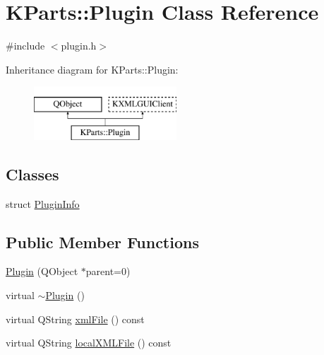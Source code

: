 \hypertarget{classKParts_1_1Plugin}{\section{K\+Parts\+:\+:Plugin Class Reference}
\label{classKParts_1_1Plugin}
}


{\ttfamily \#include $<$plugin.\+h$>$}

Inheritance diagram for K\+Parts\+:\+:Plugin\+:\begin{figure}[H]
\begin{center}
\leavevmode
\includegraphics[height=2.000000cm]{classKParts_1_1Plugin}
\end{center}
\end{figure}
\subsection*{Classes}
\begin{DoxyCompactItemize}
\item 
struct \hyperlink{structKParts_1_1Plugin_1_1PluginInfo}{Plugin\+Info}
\end{DoxyCompactItemize}
\subsection*{Public Member Functions}
\begin{DoxyCompactItemize}
\item 
\hyperlink{classKParts_1_1Plugin_ab9f6924150a0a8ec941f4e81ba22311b}{Plugin} (Q\+Object $\ast$parent=0)
\item 
virtual \hyperlink{classKParts_1_1Plugin_a8a31c0e95c1a8c467a8f22f0da9022ff}{$\sim$\+Plugin} ()
\item 
virtual Q\+String \hyperlink{classKParts_1_1Plugin_aef2c9fe874cea1c76e17418fee2a0268}{xml\+File} () const 
\item 
virtual Q\+String \hyperlink{classKParts_1_1Plugin_a5d409b39746290ef1606840ea1cb15d8}{local\+X\+M\+L\+File} () const 
\end{DoxyCompactItemize}
